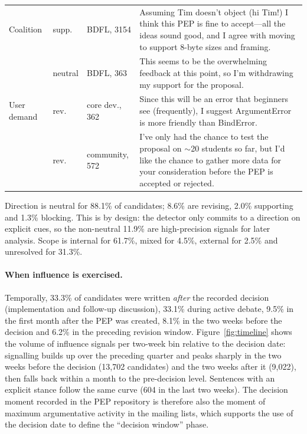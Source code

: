 \documentclass[sigconf,screen]{acmart}
\begin{document}
\begin{table}
\begin{tabular}{p{}p{}p{}p{}}
\midrule
Coalition & supp. & BDFL, 3154 & Assuming Tim doesn't object (hi Tim!) I think this PEP is fine to accept---all the ideas sound good, and I agree with moving to support 8-byte sizes and framing. \\
 & neutral & BDFL, 363 & This seems to be the overwhelming feedback at this point, so I'm withdrawing my support for the proposal. \\
\midrule
User demand & rev. & core dev., 362 & Since this will be an error that beginners see (frequently), I suggest ArgumentError is more friendly than BindError. \\
 & rev. & community, 572 & I've only had the chance to test the proposal on $\sim$20 students so far, but I'd like the chance to gather more data for your consideration before the PEP is accepted or rejected. \\
\bottomrule
\end{tabular}
\end{table}

Direction is neutral for 88.1\% of candidates; 8.6\% are revising, 2.0\% supporting and 1.3\% blocking. This is by design: the detector only commits to a direction on explicit cues, so the non-neutral 11.9\% are high-precision signals for later analysis. Scope is internal for 61.7\%, mixed for 4.5\%, external for 2.5\% and unresolved for 31.3\%.

\paragraph{When influence is exercised.} Temporally, 33.3\% of candidates were written \emph{after} the recorded decision (implementation and follow-up discussion), 33.1\% during active debate, 9.5\% in the first month after the PEP was created, 8.1\% in the two weeks before the decision and 6.2\% in the preceding revision window. Figure~\ref{fig:timeline} shows the volume of influence signals per two-week bin relative to the decision date: signalling builds up over the preceding quarter and peaks sharply in the two weeks before the decision (13,702 candidates) and the two weeks after it (9,022), then falls back within a month to the pre-decision level. Sentences with an explicit stance follow the same curve (604 in the last two weeks). The decision moment recorded in the PEP repository is therefore also the moment of maximum argumentative activity in the mailing lists, which supports the use of the decision date to define the ``decision window'' phase.
\end{document}

